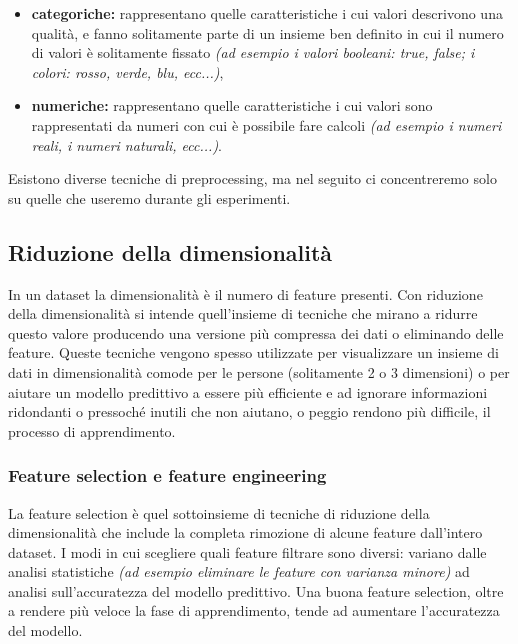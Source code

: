 \documentclass[12pt, twoside, letterpaper]{report}
\begin{document}
			\begin{itemize}
				\item \textbf{categoriche:} rappresentano quelle caratteristiche i cui valori descrivono una qualità, e fanno solitamente parte di un insieme ben definito in cui il numero di valori è solitamente fissato \textit{(ad esempio i valori booleani: true, false; i colori: rosso, verde, blu, ecc...)},
				\item \textbf{numeriche:} rappresentano quelle caratteristiche i cui valori sono rappresentati da numeri con cui è possibile fare calcoli \textit{(ad esempio i numeri reali, i numeri naturali, ecc...)}.
			\end{itemize}
			Esistono diverse tecniche di preprocessing, ma nel seguito ci concentreremo solo su quelle che useremo durante gli esperimenti.
			
			\subsection{Riduzione della dimensionalità} In un dataset la dimensionalità è il numero di feature presenti. Con riduzione della dimensionalità si intende quell'insieme di tecniche che mirano a ridurre questo valore producendo una versione più compressa dei dati o eliminando delle feature. Queste tecniche vengono spesso utilizzate per visualizzare un insieme di dati in dimensionalità comode per le persone (solitamente 2 o 3 dimensioni) o per aiutare un modello predittivo a essere più efficiente e ad ignorare informazioni ridondanti o pressoché inutili che non aiutano, o peggio rendono più difficile, il processo di apprendimento. 
			
				\subsubsection{Feature selection e feature engineering} La feature selection è quel sottoinsieme di tecniche di riduzione della dimensionalità che include la completa rimozione di alcune feature dall'intero dataset. I modi in cui scegliere quali feature filtrare sono diversi: variano dalle analisi statistiche \textit{(ad esempio eliminare le feature con varianza minore)} ad analisi sull'accuratezza del modello predittivo. Una buona feature selection, oltre a rendere più veloce la fase di apprendimento, tende ad aumentare l'accuratezza del modello. %
				
\end{document}
